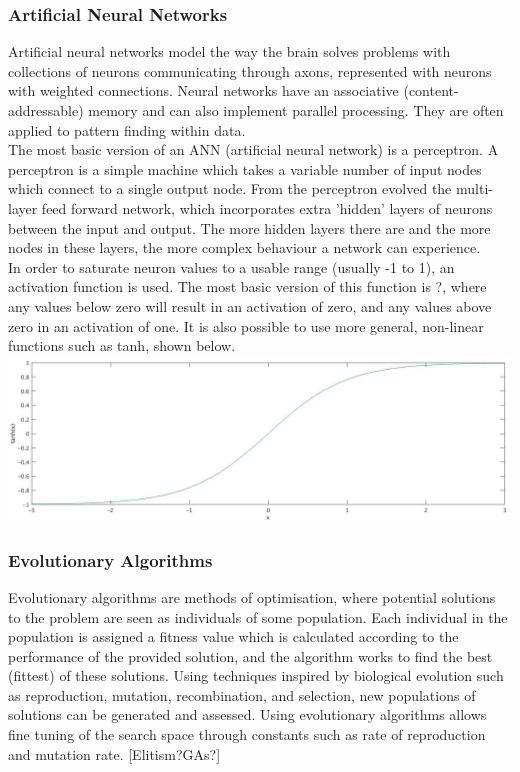 \documentclass[11pt,a4paper]{article}
\begin{document}
\subsubsection{Artificial Neural Networks}
Artificial neural networks model the way the brain solves problems with collections of neurons communicating through axons, represented with neurons with weighted connections. Neural networks have an associative (content-addressable) memory and can also implement parallel processing. They are often applied to pattern finding within data.\\

The most basic version of an ANN (artificial neural network) is a perceptron. A perceptron is a simple machine which takes a variable number of input nodes which connect to a single output node. From the perceptron evolved the multi-layer feed forward network, which incorporates extra 'hidden' layers of neurons between the input and output. The more hidden layers there are and the more nodes in these layers, the more complex behaviour a network can experience.\\

In order to saturate neuron values to a usable range (usually -1 to 1), an activation function is used. The most basic version of this function is ?, where any values below zero will result in an activation of zero, and any values above zero in an activation of one. It is also possible to use more general, non-linear functions such as tanh, shown below.\\
\includegraphics[width=\textwidth]{tanh}

\subsubsection{Evolutionary Algorithms}
Evolutionary algorithms are methods of optimisation, where potential solutions to the problem are seen as individuals of some population. Each individual in the population is assigned a fitness value which is calculated according to the performance of the provided solution, and the algorithm works to find the best (fittest) of these solutions. Using techniques inspired by biological evolution such as reproduction, mutation, recombination, and selection, new populations of solutions can be generated and assessed. Using evolutionary algorithms allows fine tuning of the search space through constants such as rate of reproduction and mutation rate. [Elitism?GAs?]
\end{document}
